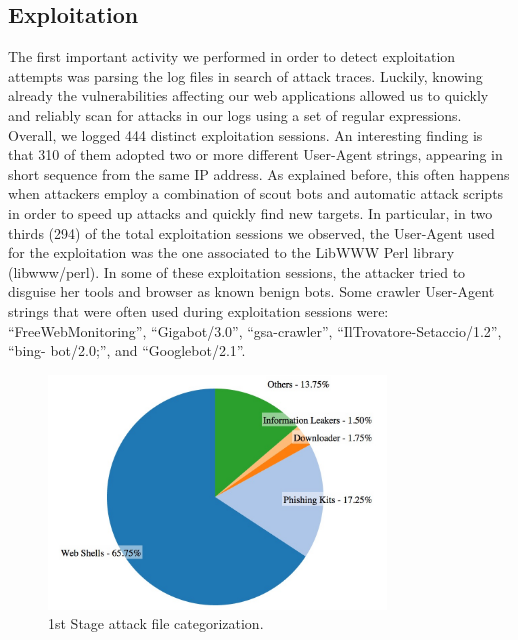 \subsection{Exploitation}

The first important activity we performed in order to detect exploitation attempts was parsing the log files in search of attack traces. Luckily, knowing already the vulnerabilities affecting our web applications allowed us to quickly and reliably scan for attacks in our logs using a set of regular expressions.
Overall, we logged 444 distinct exploitation sessions. An interesting finding is that 310 of them adopted two or more different User-Agent strings, appearing in short sequence from the same IP address. As explained before, this often happens when attackers employ a combination of scout bots and automatic attack scripts in order to speed up attacks and quickly find new targets. In particular, in two thirds (294) of the total exploitation sessions we observed, the User-Agent used for the exploitation was the one associated to the LibWWW Perl library (libwww/perl).
In some of these exploitation sessions, the attacker tried to disguise her tools and browser as known benign bots. Some crawler User-Agent strings that were often used during exploitation sessions were: ``FreeWebMonitoring'', ``Gigabot/3.0'', ``gsa-crawler'', ``IlTrovatore-Setaccio/1.2'', ``bing- bot/2.0;'', and ``Googlebot/2.1''.

\begin{figure}[tbh]
\centerline{\includegraphics[width=0.8\textwidth]{Images/1stStageAttack.jpg}}
\caption{1st Stage attack file categorization.\label{fig:1stStageAttack}}
\end{figure}

